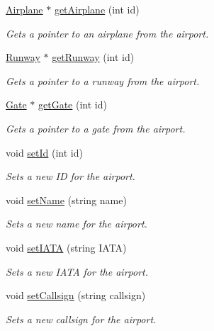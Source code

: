 \begin{DoxyCompactItemize}
\mbox{\hyperlink{class_airplane}{Airplane}} $\ast$ \mbox{\hyperlink{class_airport_a29db3fa31b450d90b9a81c9c55d4a320}{get\+Airplane}} (int id)
\begin{DoxyCompactList}\small\item\em Gets a pointer to an airplane from the airport. \end{DoxyCompactList}\item 
\mbox{\hyperlink{class_runway}{Runway}} $\ast$ \mbox{\hyperlink{class_airport_a1d7b9530df732ebee79ce0f1de7616e2}{get\+Runway}} (int id)
\begin{DoxyCompactList}\small\item\em Gets a pointer to a runway from the airport. \end{DoxyCompactList}\item 
\mbox{\hyperlink{class_gate}{Gate}} $\ast$ \mbox{\hyperlink{class_airport_a06570bd57b66959e22ec2fdbf24d3a36}{get\+Gate}} (int id)
\begin{DoxyCompactList}\small\item\em Gets a pointer to a gate from the airport. \end{DoxyCompactList}\item 
void \mbox{\hyperlink{class_airport_a3b8ef3abafb9f29b97acb73eb8014502}{set\+Id}} (int id)
\begin{DoxyCompactList}\small\item\em Sets a new ID for the airport. \end{DoxyCompactList}\item 
void \mbox{\hyperlink{class_airport_a064fd9435cd179b04d94c04a18a96583}{set\+Name}} (string name)
\begin{DoxyCompactList}\small\item\em Sets a new name for the airport. \end{DoxyCompactList}\item 
void \mbox{\hyperlink{class_airport_a9555c51c003f8acb412e07442cb920c8}{set\+I\+A\+TA}} (string I\+A\+TA)
\begin{DoxyCompactList}\small\item\em Sets a new I\+A\+TA for the airport. \end{DoxyCompactList}\item 
void \mbox{\hyperlink{class_airport_a211a2877b1d654a9a50b28f260eec159}{set\+Callsign}} (string callsign)
\begin{DoxyCompactList}\small\item\em Sets a new callsign for the airport. \end{DoxyCompactList}\item 

\end{DoxyCompactItemize}

